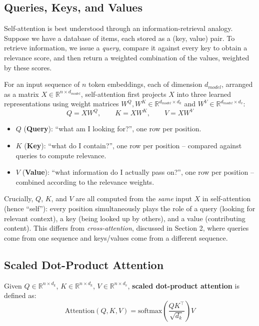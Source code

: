 \documentclass[11pt]{article}
\begin{document}
\subsection*{Queries, Keys, and Values}

Self-attention is best understood through an information-retrieval analogy. Suppose we have a database of items, each stored as a (key, value) pair. To retrieve information, we issue a \emph{query}, compare it against every key to obtain a relevance score, and then return a weighted combination of the values, weighted by these scores.

\begin{defbox}
For an input sequence of $n$ token embeddings, each of dimension $d_{model}$, arranged as a matrix $X \in \mathbb{R}^{n \times d_{model}}$, self-attention first projects $X$ into three learned representations using weight matrices $W^Q, W^K \in \mathbb{R}^{d_{model} \times d_k}$ and $W^V \in \mathbb{R}^{d_{model}\times d_v}$:
\[
Q = XW^Q, \qquad K = XW^K, \qquad V = XW^V
\]
\begin{itemize}[leftmargin=1.5em]
    \item $Q$ (\textbf{Query}): ``what am I looking for?'', one row per position.
    \item $K$ (\textbf{Key}): ``what do I contain?'', one row per position -- compared against queries to compute relevance.
    \item $V$ (\textbf{Value}): ``what information do I actually pass on?'', one row per position -- combined according to the relevance weights.
\end{itemize}
\end{defbox}

\begin{keyidea}
Crucially, $Q$, $K$, and $V$ are all computed from the \emph{same} input $X$ in self-attention (hence ``self''): every position simultaneously plays the role of a query (looking for relevant context), a key (being looked up by others), and a value (contributing content). This differs from \emph{cross-attention}, discussed in Section 2, where queries come from one sequence and keys/values come from a different sequence.
\end{keyidea}

\subsection*{Scaled Dot-Product Attention}

\begin{definition}
Given $Q \in \mathbb{R}^{n\times d_k}$, $K \in \mathbb{R}^{n\times d_k}$, $V \in \mathbb{R}^{n\times d_v}$, \textbf{scaled dot-product attention} is defined as:
\[
\text{Attention}(Q,K,V) = \text{softmax}\!\left(\frac{QK^\top}{\sqrt{d_k}}\right) V
\]
\end{definition}
\end{document}
